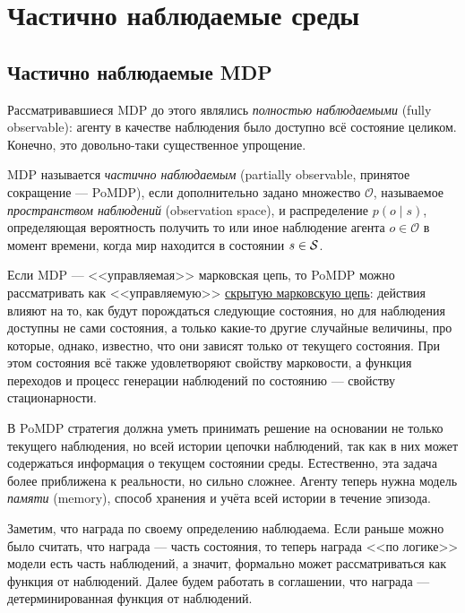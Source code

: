 \section{Частично наблюдаемые среды}\label{sec:PoMDP}

\subsection{Частично наблюдаемые MDP}

Рассматривавшиеся MDP до этого являлись \emph{полностью наблюдаемыми} (fully observable): агенту в качестве наблюдения было доступно всё состояние целиком. Конечно, это довольно-таки существенное упрощение.

\begin{definition}
MDP называется \emph{частично наблюдаемым} (partially observable, принятое сокращение --- PoMDP), если дополнительно задано множество $\mathcal{O}$, называемое \emph{пространством наблюдений} (observation space), и распределение $p(o \mid s)$, определяющая вероятность получить то или иное наблюдение агента $o \in \mathcal{O}$ в момент времени, когда мир находится в состоянии $s \in \mathcal{S}$.
\end{definition}

Если MDP --- <<управляемая>> марковская цепь, то PoMDP можно рассматривать как <<управляемую>> \href{https://en.wikipedia.org/wiki/Hidden_Markov_model}{скрытую марковскую цепь}: действия влияют на то, как будут порождаться следующие состояния, но для наблюдения доступны не сами состояния, а только какие-то другие случайные величины, про которые, однако, известно, что они зависят только от текущего состояния. При этом состояния всё также удовлетворяют свойству марковости, а функция переходов и процесс генерации наблюдений по состоянию --- свойству стационарности.

В PoMDP стратегия должна уметь принимать решение на основании не только текущего наблюдения, но всей истории цепочки наблюдений, так как в них может содержаться информация о текущем состоянии среды. Естественно, эта задача более приближена к реальности, но сильно сложнее. Агенту теперь нужна модель \emph{памяти} (memory), способ хранения и учёта всей истории в течение эпизода.

Заметим, что награда по своему определению наблюдаема. Если раньше можно было считать, что награда --- часть состояния, то теперь награда <<по логике>> модели есть часть наблюдений, а значит, формально может рассматриваться как функция от наблюдений. Далее будем работать в соглашении, что награда --- детерминированная функция от наблюдений.

